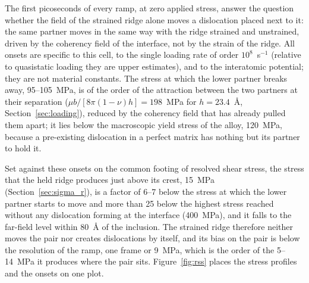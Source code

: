 The first picoseconds of every ramp, at zero applied stress, answer the question whether the field of the strained ridge alone moves a dislocation placed next to it: the same partner moves in the same way with the ridge strained and unstrained, driven by the coherency field of the interface, not by the strain of the ridge. All onsets are specific to this cell, to the single loading rate
of order $10^{8}$~s$^{-1}$ (relative to quasistatic loading they are upper
estimates), and to the interatomic potential; they are not material
constants. The stress at which the lower partner breaks away,
95--105~MPa, is of the order of the attraction between the two
partners at their separation ($\mu b/[8\pi(1-\nu)h]=198$~MPa for
$h=23.4$~\AA{}, Section~\ref{sec:loading}), reduced by the coherency field
that has already pulled them apart; it lies below the macroscopic yield
stress of the alloy, 120~MPa, because a pre-existing dislocation in a perfect
matrix has nothing but its partner to hold it.

Set against these onsets on the common footing of resolved shear stress, the
stress that the held ridge produces just above its crest, 15~MPa
(Section~\ref{sec:sigma_r}), is a factor of 6--7 below the stress at
which the lower partner starts to move and more than 25 below the highest stress reached without any dislocation forming at the interface (400~MPa), and it falls to
the far-field level within 80~\AA{} of the inclusion. The strained ridge
therefore neither moves the pair nor creates dislocations by itself, and
its bias on the pair is below the resolution of the ramp, one frame or
9~MPa, which is the order of the 5--14~MPa it produces where the pair sits. Figure~\ref{fig:rss} places the
stress profiles and the onsets on one plot.

